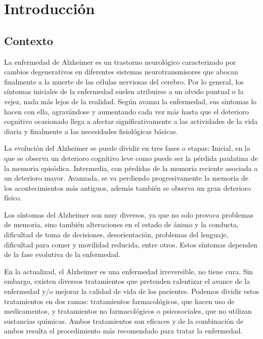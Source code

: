 \chapter{Introducción}
\label{cap:introduccion}


\section{Contexto}
La enfermedad de Alzheimer es un trastorno neurológico caracterizado por cambios degenerativos en diferentes sistemas neurotransmisores que abocan finalmente a la muerte de las células nerviosas del cerebro. Por lo general, los síntomas iniciales de la enfermedad suelen atribuirse a un olvido puntual o la vejez, nada más lejos de la realidad. Según avanza la enfermedad, sus síntomas lo hacen con ella, agravándose y aumentando cada vez más hasta que el deterioro cognitivo ocasionado llega a afectar significativamente a las actividades de la vida diaria y finalmente a las necesidades fisiológicas básicas.

La evolución del Alzheimer se puede dividir en tres fases o etapas: Inicial, en la que se observa un deterioro cognitivo leve como puede ser la pérdida paulatina de la memoria episódica. Intermedia, con pérdidas de la memoria reciente asociada a un deterioro mayor. Avanzada, se va perdiendo progresivamente la memoria de los acontecimientos más antiguos, además también se observa un gran deterioro físico.

Los síntomas del Alzheimer son muy diversos, ya que no solo provoca problemas de memoria, sino también alteraciones en el estado de ánimo y la conducta, dificultad de toma de decisiones, desorientación, problemas del lenguaje, dificultad para comer y movilidad reducida, entre otros. Estos síntomas dependen de la fase evolutiva de la enfermedad.

En la actualizad, el Alzheimer es una enfermedad irreversible, no tiene cura. Sin embargo, existen diversos tratamientos que pretenden ralentizar el avance de la enfermedad y/o mejorar la calidad de vida de los pacientes. Podemos dividir estos tratamientos en dos ramas: tratamientos farmacológicos, que hacen uso de medicamentos, y tratamientos no farmacológicos o psicosociales, que no utilizan sustancias químicas. Ambos tratamientos son eficaces y de la combinación de ambos resulta el procedimiento más recomendado para tratar la enfermedad.

